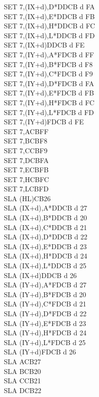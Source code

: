 \documentclass[oneside,a4paper]{book}
\begin{document}
\begin{multicols}{3}
{\begin{tabbing}
SET 7,(IX+d),D*\>DDCB d FA\\
SET 7,(IX+d),E*\>DDCB d FB\\
SET 7,(IX+d),H*\>DDCB d FC\\
SET 7,(IX+d),L*\>DDCB d FD\\
SET 7,(IX+d)\>DDCB d FE\\
SET 7,(IY+d),A*\>FDCB d FF\\
SET 7,(IY+d),B*\>FDCB d F8\\
SET 7,(IY+d),C*\>FDCB d F9\\
SET 7,(IY+d),D*\>FDCB d FA\\
SET 7,(IY+d),E*\>FDCB d FB\\
SET 7,(IY+d),H*\>FDCB d FC\\
SET 7,(IY+d),L*\>FDCB d FD\\
SET 7,(IY+d)\>FDCB d FE\\
SET 7,A\>CBFF\\
SET 7,B\>CBF8\\
SET 7,C\>CBF9\\
SET 7,D\>CBFA\\
SET 7,E\>CBFB\\
SET 7,H\>CBFC\\
SET 7,L\>CBFD\\
SLA (HL)\>CB26\\
SLA (IX+d),A*\>DDCB d 27\\
SLA (IX+d),B*\>DDCB d 20\\
SLA (IX+d),C*\>DDCB d 21\\
SLA (IX+d),D*\>DDCB d 22\\
SLA (IX+d),E*\>DDCB d 23\\
SLA (IX+d),H*\>DDCB d 24\\
SLA (IX+d),L*\>DDCB d 25\\
SLA (IX+d)\>DDCB d 26\\
SLA (IY+d),A*\>FDCB d 27\\
SLA (IY+d),B*\>FDCB d 20\\
SLA (IY+d),C*\>FDCB d 21\\
SLA (IY+d),D*\>FDCB d 22\\
SLA (IY+d),E*\>FDCB d 23\\
SLA (IY+d),H*\>FDCB d 24\\
SLA (IY+d),L*\>FDCB d 25\\
SLA (IY+d)\>FDCB d 26\\
SLA A\>CB27\\
SLA B\>CB20\\
SLA C\>CB21\\
SLA D\>CB22\\

\end{tabbing}}
\end{multicols}
\end{document}
